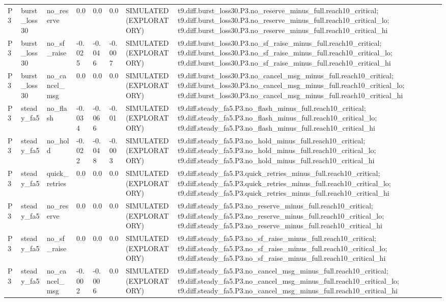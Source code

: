 \begin{table}[t]
\begin{tabular}{llllllll}
P3 & burst\_loss30 & no\_reserve & 0.0 & 0.0 & 0.0 & SIMULATED (EXPLORATORY) & t9.diff.burst\_loss30.P3.no\_reserve\_minus\_full.reach10\_critical; t9.diff.burst\_loss30.P3.no\_reserve\_minus\_full.reach10\_critical\_lo; t9.diff.burst\_loss30.P3.no\_reserve\_minus\_full.reach10\_critical\_hi \\
P3 & burst\_loss30 & no\_sf\_raise & -0.025 & -0.046 & -0.007 & SIMULATED (EXPLORATORY) & t9.diff.burst\_loss30.P3.no\_sf\_raise\_minus\_full.reach10\_critical; t9.diff.burst\_loss30.P3.no\_sf\_raise\_minus\_full.reach10\_critical\_lo; t9.diff.burst\_loss30.P3.no\_sf\_raise\_minus\_full.reach10\_critical\_hi \\
P3 & burst\_loss30 & no\_cancel\_msg & 0.0 & 0.0 & 0.0 & SIMULATED (EXPLORATORY) & t9.diff.burst\_loss30.P3.no\_cancel\_msg\_minus\_full.reach10\_critical; t9.diff.burst\_loss30.P3.no\_cancel\_msg\_minus\_full.reach10\_critical\_lo; t9.diff.burst\_loss30.P3.no\_cancel\_msg\_minus\_full.reach10\_critical\_hi \\
P3 & steady\_fa5 & no\_flash & -0.034 & -0.066 & -0.01 & SIMULATED (EXPLORATORY) & t9.diff.steady\_fa5.P3.no\_flash\_minus\_full.reach10\_critical; t9.diff.steady\_fa5.P3.no\_flash\_minus\_full.reach10\_critical\_lo; t9.diff.steady\_fa5.P3.no\_flash\_minus\_full.reach10\_critical\_hi \\
P3 & steady\_fa5 & no\_hold & -0.022 & -0.048 & -0.003 & SIMULATED (EXPLORATORY) & t9.diff.steady\_fa5.P3.no\_hold\_minus\_full.reach10\_critical; t9.diff.steady\_fa5.P3.no\_hold\_minus\_full.reach10\_critical\_lo; t9.diff.steady\_fa5.P3.no\_hold\_minus\_full.reach10\_critical\_hi \\
P3 & steady\_fa5 & quick\_retries & 0.0 & 0.0 & 0.0 & SIMULATED (EXPLORATORY) & t9.diff.steady\_fa5.P3.quick\_retries\_minus\_full.reach10\_critical; t9.diff.steady\_fa5.P3.quick\_retries\_minus\_full.reach10\_critical\_lo; t9.diff.steady\_fa5.P3.quick\_retries\_minus\_full.reach10\_critical\_hi \\
P3 & steady\_fa5 & no\_reserve & 0.0 & 0.0 & 0.0 & SIMULATED (EXPLORATORY) & t9.diff.steady\_fa5.P3.no\_reserve\_minus\_full.reach10\_critical; t9.diff.steady\_fa5.P3.no\_reserve\_minus\_full.reach10\_critical\_lo; t9.diff.steady\_fa5.P3.no\_reserve\_minus\_full.reach10\_critical\_hi \\
P3 & steady\_fa5 & no\_sf\_raise & 0.0 & 0.0 & 0.0 & SIMULATED (EXPLORATORY) & t9.diff.steady\_fa5.P3.no\_sf\_raise\_minus\_full.reach10\_critical; t9.diff.steady\_fa5.P3.no\_sf\_raise\_minus\_full.reach10\_critical\_lo; t9.diff.steady\_fa5.P3.no\_sf\_raise\_minus\_full.reach10\_critical\_hi \\
P3 & steady\_fa5 & no\_cancel\_msg & -0.002 & -0.006 & 0.0 & SIMULATED (EXPLORATORY) & t9.diff.steady\_fa5.P3.no\_cancel\_msg\_minus\_full.reach10\_critical; t9.diff.steady\_fa5.P3.no\_cancel\_msg\_minus\_full.reach10\_critical\_lo; t9.diff.steady\_fa5.P3.no\_cancel\_msg\_minus\_full.reach10\_critical\_hi \\
\bottomrule
\end{tabular}
\end{table}
